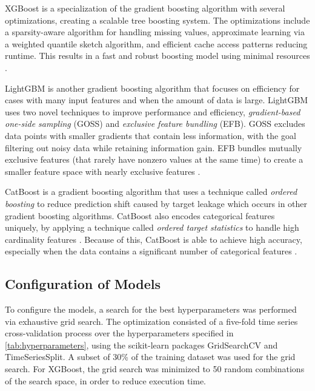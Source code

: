 XGBoost is a specialization of the gradient boosting algorithm with several optimizations, creating a scalable tree boosting system. The optimizations include a sparsity-aware algorithm for handling missing values, approximate learning via a weighted quantile sketch algorithm, and efficient cache access patterns reducing runtime. This results in a fast and robust boosting model using minimal resources \cite{chen_xgboost_2016}.

LightGBM is another gradient boosting algorithm that focuses on efficiency for cases with many input features and when the amount of data is large. LightGBM uses two novel techniques to improve performance and efficiency, \emph{gradient-based one-side sampling} (GOSS) and \emph{exclusive feature bundling} (EFB). GOSS excludes data points with smaller gradients that contain less information, with the goal filtering out noisy data while retaining information gain. EFB bundles mutually exclusive features (that rarely have nonzero values at the same time) to create a smaller feature space with nearly exclusive features \cite{ke_lightgbm_2017}.

CatBoost is a gradient boosting algorithm that uses a technique called \emph{ordered boosting} to reduce prediction shift caused by target leakage which occurs in other gradient boosting algorithms. CatBoost also encodes categorical features uniquely, by applying a technique called \emph{ordered target statistics} to handle high cardinality features \cite{prokhorenkova_catboost_2018}. Because of this, CatBoost is able to achieve high accuracy, especially when the data contains a significant number of categorical features \cite{moon_advancing_2024}.

\subsection{Configuration of Models}

To configure the models, a search for the best hyperparameters was performed via exhaustive grid search. The optimization consisted of a five-fold time series cross-validation process over the hyperparameters specified in \autoref{tab:hyperparameters}, using the scikit-learn packages GridSearchCV and TimeSeriesSplit. A subset of 30\% of the training dataset was used for the grid search. For XGBoost, the grid search was minimized to 50 random combinations of the search space, in order to reduce execution time.

